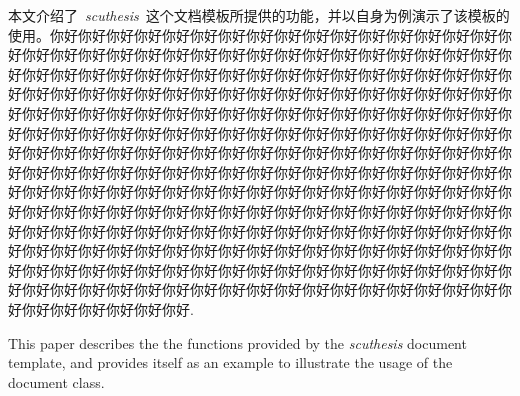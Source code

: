 
\begin{CHSabstract}
	本文介绍了~\emph{scuthesis}~这个文档模板所提供的功能，并以自身为例演示了该模板的使用。你好你好你好你好你好你好你好你好你好你好你好你好你好你好你好你好你好你好你好你好你好你好你好你好你好你好你好你好你好你好你好你好你好你好你好你好你好你好你好你好你好你好你好你好你好你好你好你好你好你好你好你好你好你好你好你好你好你好你好你好你好你好你好你好你好你好你好你好你好你好你好你好你好你好你好你好你好你好你好你好你好你好你好你好你好你好你好你好你好你好你好你好你好你好你好你好你好你好你好你好你好你好你好你好你好你好你好你好你好你好你好你好你好你好你好你好你好你好你好你好你好你好你好你好你好你好你好你好你好你好你好你好你好你好你好你好你好你好你好你好你好你好你好你好你好你好你好你好你好你好你好你好你好你好你好你好你好你好你好你好你好你好你好你好你好你好你好你好你好你好你好你好你好你好你好你好你好你好你好你好你好你好你好你好你好你好你好你好你好你好你好你好你好你好你好你好你好你好你好你好你好你好你好你好你好你好你好你好你好你好你好你好你好你好你好你好你好你好你好你好你好你好你好你好你好你好你好你好你好你好你好你好你好你好你好你好你好你好你好你好你好你好你好你好你好你好你好你好你好你好你好你好你好你好你好你好你好.
\end{CHSabstract}
\begin{ENGabstract}
	This paper describes the the functions provided by
	the \emph{scuthesis} document template,
	and provides itself as an example to illustrate
	the usage of the document class.
\end{ENGabstract}
